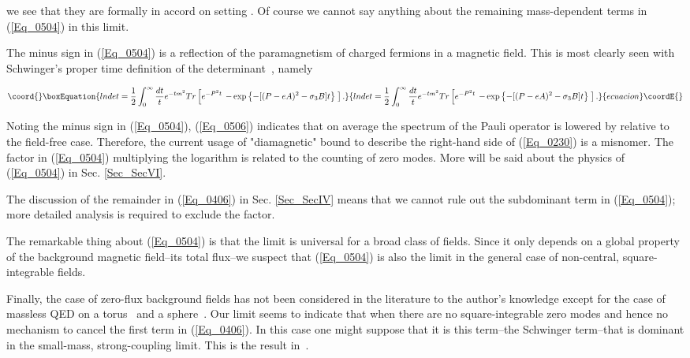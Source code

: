 \documentclass[a4paper,twocolumn,showpacs,preprintnumbers,amsmath,amssymb]{revtex4}
\providecommand{\half}{\frac{1}{2}}
\begin{document}
\noindent
we see that they are formally in accord on setting
\coordHE{}. Of course we cannot say anything about the
remaining mass-dependent terms in (\ref{Eq_0504}) in this limit.

The minus sign in (\ref{Eq_0504}) is a reflection of the paramagnetism
of charged fermions in a magnetic field. This is most clearly seen
with Schwinger's proper time definition of the
determinant~\cite{Schwinger51}, namely

\begin{widetext}
\begin{equation}\coord{}\boxEquation{
\label{Eq_0506}
lndet = \half \int^{\infty}_0 \frac{dt}{t} e^{-tm^2} Tr
  \left[
  e^{-P^2 t}
  \right.
  \left.
  - \exp\left\{-[(P-eA)^2 - \sigma_3 B]t\right\} \;
  \right].
}{
lndet = \half \int^{\infty}_0 \frac{dt}{t} e^{-tm^2} Tr
  \left[
  e^{-P^2 t}
  \right.
  \left.
  - \exp\left\{-[(P-eA)^2 - \sigma_3 B]t\right\} \;
  \right].
}{ecuacion}\coordE{}\end{equation}
\end{widetext}

\noindent
Noting the minus sign in (\ref{Eq_0504}), (\ref{Eq_0506})
indicates that on average the spectrum of the Pauli operator is
lowered by \coordHE{} relative to the field-free case. Therefore, the current
usage of "diamagnetic" bound to describe the right-hand side of
(\ref{Eq_0230}) is a misnomer. The factor \coordHE{} in (\ref{Eq_0504})
multiplying the logarithm is related to the counting of zero
modes. More will be said about the physics of (\ref{Eq_0504}) in
Sec. \ref{Sec_SecVI}.

The discussion of the remainder in (\ref{Eq_0406}) in
Sec. \ref{Sec_SecIV} means that we cannot rule out the subdominant
term \coordHE{} in (\ref{Eq_0504}); more detailed
analysis is required to exclude the \coordHE{} factor.

The remarkable thing about (\ref{Eq_0504}) is that the limit is
universal for a broad class of fields. Since it only depends on a
global property of the background magnetic field--its total flux--we
suspect that (\ref{Eq_0504}) is also the limit in the general case of
non-central, square-integrable fields.

Finally, the case of zero-flux background fields has not been
considered in the literature to the author's knowledge except for the
case of massless QED\coordHE{} on a torus~\cite{Sachs92} and a
sphere~\cite{Jayewardena88}. Our limit seems to indicate that when
\coordHE{} there are no square-integrable zero modes and hence no
mechanism to cancel the first term in (\ref{Eq_0406}).  In this case
one might suppose that it is this term--the Schwinger term--that is
dominant in the small-mass, strong-coupling limit. This is the result
in~\cite{Sachs92}.
\end{document}
